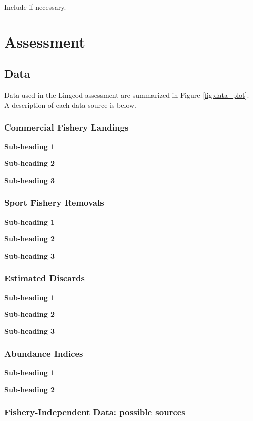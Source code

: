 \documentclass[12pt,]{article}
\begin{document}
Include if necessary.

\section{Assessment}\label{assessment}

\subsection{Data}\label{data}

Data used in the Lingcod assessment are summarized in Figure
\ref{fig:data_plot}.\\
A description of each data source is below.

\subsubsection{Commercial Fishery
Landings}\label{commercial-fishery-landings}

\textbf{Sub-heading 1}

\textbf{Sub-heading 2}

\textbf{Sub-heading 3}

\subsubsection{Sport Fishery Removals}\label{sport-fishery-removals}

\textbf{Sub-heading 1}

\textbf{Sub-heading 2}

\textbf{Sub-heading 3}

\subsubsection{Estimated Discards}\label{estimated-discards}

\textbf{Sub-heading 1}

\textbf{Sub-heading 2}

\textbf{Sub-heading 3}

\subsubsection{Abundance Indices}\label{abundance-indices}

\textbf{Sub-heading 1}

\textbf{Sub-heading 2}

\subsubsection{Fishery-Independent Data: possible
sources}\label{fishery-independent-data-possible-sources}
\end{document}

